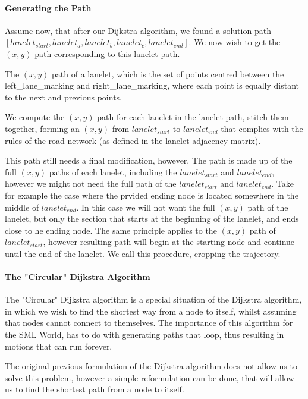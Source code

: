 \paragraph{Generating the Path}

Assume now, that after our Dijkstra algorithm, we found a solution path $ [lanelet_{start},\allowbreak lanelet_{a},\allowbreak lanelet_{b},\allowbreak lanelet_{c},\allowbreak lanelet_{end}]$. We now wish to get the $(x,y)$ path corresponding to this lanelet path. 

The $(x,y)$ path of a lanelet, which is the set of points centred between the left\_lane\_marking and right\_lane\_marking, where each point is equally distant to the next and previous points.

We compute the $(x,y)$ path for each lanelet in the lanelet path, stitch them together, forming an $(x,y)$ from $lanelet_{start}$ to $lanelet_{end}$ that complies with the rules of the road network (as defined in the lanelet adjacency matrix).

This path still needs a final modification, however. The path is made up of the full $(x,y)$ paths of each lanelet, including the $lanelet_{start}$ and $lanelet_{end}$, however we might not need the full path of the $lanelet_{start}$ and $lanelet_{end}$. Take for example the case where the prvided ending node is located somewhere in the middle of $lanelet_{end}$. In this case we will not want the full $(x,y)$ path of the lanelet, but only the section that starts at the beginning of the lanelet, and ends close to he ending node. The same principle applies to the $(x,y)$ path of $lanelet_{start}$, however resulting path will begin at the starting node and continue until the end of the lanelet. We call this procedure, cropping the trajectory.

\paragraph{The "Circular" Dijkstra Algorithm}

The "Circular" Dijkstra algorithm is a special situation of the Dijkstra algorithm, in which we wish to find the shortest way from a node to itself, whilst assuming that nodes cannot connect to themselves. The importance of this algorithm for the SML World, has to do with generating paths that loop, thus resulting in motions that can run forever.

The original previous formulation of the Dijkstra algorithm does not allow us to solve this problem, however a simple reformulation can be done, that will allow us to find the shortest path from a node to itself.

